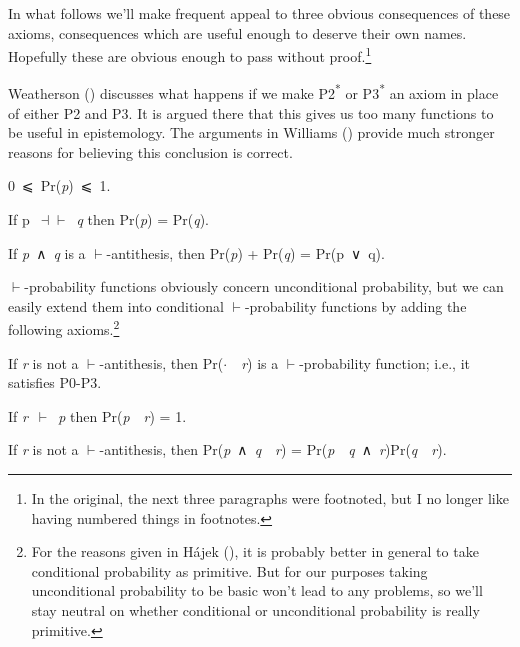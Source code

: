 \documentclass[
  10pt,
  letterpaper,
  DIV=11,
  numbers=noendperiod,
  twoside]{scrartcl}
\providecommand{\tightlist}{%
  \setlength{\itemsep}{0pt}\setlength{\parskip}{0pt}}\usepackage{longtable,booktabs,array}
\begin{document}
In what follows we'll make frequent appeal to three obvious consequences
of these axioms, consequences which are useful enough to deserve their
own names. Hopefully these are obvious enough to pass without
proof.\footnote{In the original, the next three paragraphs were
  footnoted, but I no longer like having numbered things in footnotes.}

Weatherson () discusses what happens
if we make P2\textsuperscript{*} or P3\textsuperscript{*} an axiom in
place of either P2 and P3. It is argued there that this gives us too
many functions to be useful in epistemology. The arguments in Williams
() provide much stronger reasons for
believing this conclusion is correct.

\begin{description}
\tightlist
\item[(P1\textsuperscript{*})]
0~⩽~Pr(\emph{p})~⩽~1.
\item[(P2\textsuperscript{*})]
If p~\(\dashv \vdash\)~\emph{q} then Pr(\emph{p}) = Pr(\emph{q}).
\item[(P3\textsuperscript{*})]
If \emph{p}~∧~\emph{q} is a \(\vdash\)-antithesis, then Pr(\emph{p}) +
Pr(\emph{q}) = Pr(p~∨~q).
\end{description}

\(\vdash\)-probability functions obviously concern unconditional
probability, but we can easily extend them into conditional
\(\vdash\)-probability functions by adding the following
axioms.\footnote{For the reasons given in Hájek
  (), it is probably better in general to
  take conditional probability as primitive. But for our purposes taking
  unconditional probability to be basic won't lead to any problems, so
  we'll stay neutral on whether conditional or unconditional probability
  is really primitive.}

\begin{description}
\tightlist
\item[(P4)]
If \emph{r} is not a \(\vdash\)-antithesis, then
Pr(\(\cdot\)~\textbar~\emph{r}) is a \(\vdash\)-probability function;
i.e., it satisfies P0-P3.
\item[(P5)]
If \emph{r}~\(\vdash\)~\emph{p} then Pr(\emph{p}~\textbar~\emph{r}) = 1.
\item[(P6)]
If \emph{r} is not a \(\vdash\)-antithesis, then
Pr(\emph{p}~∧~\emph{q}~\textbar~\emph{r}) =
Pr(\emph{p}~\textbar~\emph{q}~∧~\emph{r})Pr(\emph{q}~\textbar~\emph{r}).
\end{description}
\end{document}
